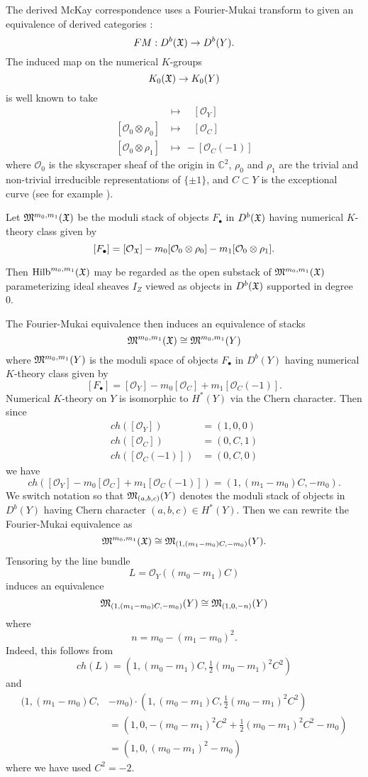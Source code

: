 \documentclass{article}
\theoremstyle{definition}
\newcommand{\CC} {{\mathbb C}}          %
\newcommand{\X}{\frak{X}}
\newcommand{\M}{\frak{M}}
\renewcommand{\O}{\mathcal{O}}
\newcommand{\Hilb}{\operatorname{Hilb}}
\begin{document}
The derived McKay correspondence uses a Fourier-Mukai transform to
given an equivalence of derived categories \cite{BKR}:
\[
FM:D^{b}(\X )\to D^{b}(Y).
\]
The induced map on the numerical $K$-groups
\[
K_{0}(\X ) \to K_{0}(Y)
\]
is well known to take
\begin{align*}
[\O_{\X}]& \longmapsto \quad [\O_{Y}] \\
[\O_{0}\otimes \rho_{0}] &\longmapsto  \quad [\O_{C}]\\
[\O_{0}\otimes \rho_{1}] &\longmapsto \, -[\O_{C}(-1)]
\end{align*}
where $\O_{0}$ is the skyscraper sheaf of the origin in $\CC^{2}$,
$\rho_{0}$ and $\rho_{1}$ are the trivial and non-trivial irreducible
representations of $\{\pm 1 \}$, and $C\subset Y$ is the exceptional
curve (see for example \cite{Gonzalez-Sprinberg-Verdier}).

Let $\M^{m_{0},m_{1}}(\X )$ be the moduli stack of objects $F_{\bullet }$ in
$D^{b}(\X )$ having numerical $K$-theory class given by
\[
[F_{\bullet}] = [\O_{\X}] - m_{0}[\O_{0}\otimes \rho_{0}]  - m_{1}[\O_{0}\otimes \rho_{1}] .
\]

Then $\Hilb^{m_{0},m_{1}}(\X )$ may be regarded as the  open substack
of $\M^{m_{0},m_{1}}(\X )$ parameterizing ideal sheaves $I_{Z}$ viewed
as objects in $D^{b}(\X )$ supported in degree 0.

The Fourier-Mukai equivalence then induces an equivalence of stacks
\[
\M^{m_{0},m_{1}}(\X ) \cong  \M^{m_{0},m_{1}}(Y)
\]
where $ \M^{m_{0},m_{1}}(Y)$ is the moduli space of objects
$F_{\bullet}$ in $D^{b}(Y)$ having numerical $K$-theory class given by
\[
[F_{\bullet}] = [\O_{Y}] - m_{0} [\O_{C}]+ m_{1} [\O_{C}(-1)]. 
\]
Numerical $K$-theory on $Y$ is isomorphic to $H^{*}(Y)$ via the Chern
character. Then since
\begin{align*}
ch([\O_{Y}]) &= (1,0,0)\\
ch([\O_{C}]) &= (0,C,1)\\
ch([\O_{C}(-1)]) &= (0,C,0)
\end{align*}
we have
\[
ch( [\O_{Y}] - m_{0} [\O_{C}]+ m_{1} [\O_{C}(-1)]) = (1,(m_{1}-m_{0})C,-m_{0}).
\]
We switch notation so that $\M_{(a,b,c)}(Y)$ denotes the moduli stack
of objects in $D^{b}(Y)$ having Chern character $(a,b,c)\in
H^{*}(Y)$. Then we can rewrite the Fourier-Mukai equivalence as
\[
\M^{m_{0},m_{1}}(\X ) \cong \M_{(1,(m_{1}-m_{0})C,-m_{0})}(Y). 
\]
Tensoring by the line bundle
\[
L = \O_{Y}((m_{0}-m_{1})C)
\]
induces an equivalence
\[
\M_{(1,(m_{1}-m_{0})C,-m_{0})}(Y) \cong \M_{(1,0,-n)}(Y)
\]
where
\[
n=m_{0} -(m_{1}-m_{0})^{2}. 
\]
Indeed, this follows from
\[
ch(L) = \left(1,(m_{0}-m_{1})C,\tfrac{1}{2} (m_{0}-m_{1})^{2}C^{2} \right)
\]
and 
\begin{align*}
(1,(m_{1}-m_{0})C,&-m_{0}) \cdot  (1,(m_{0}-m_{1})C,\tfrac{1}{2}
(m_{0}-m_{1})^{2}C^{2})\\
 &= (1,0, - (m_{0}-m_{1})^{2}C^{2} +\tfrac{1}{2}
(m_{0}-m_{1})^{2}C^{2} -m_{0})\\
&= (1,0,(m_{0}-m_{1})^{2}-m_{0})
\end{align*}
where we have used $C^{2}=-2$.
\end{document}
